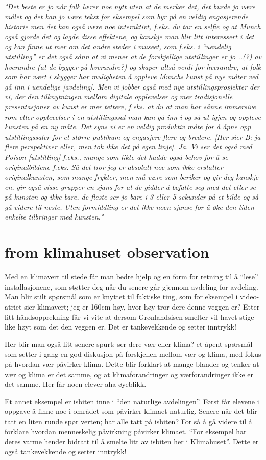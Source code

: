 \emph{"Det beste er jo når folk lærer noe nytt uten at de merker det, det burde jo være målet og det kan jo være tekst for eksempel som byr på en veldig engasjerende historie men det kan også være noe interaktivt, f.eks. du tar en selfie og at Munch også gjorde det og lagde disse effektene, og kanskje man blir litt interessert i det og kan finne ut mer om det andre steder i museet, som f.eks. i “uendelig utstilling” er det også sånn at vi mener at de forskjellige utstillinger er jo ..(?) av hverandre (at de bygger på hverandre?) og skaper altså verdi for hverandre, at folk som har vært i skygger har muligheten å oppleve Munchs kunst på nye måter ved gå inn i uendelige [avdeling]. Men vi jobber også med nye utstillingsprosjekter der vi, der den tilknytningen mellom digitale opplevelser og mer tradisjonelle presentasjoner av kunst er mer tettere, f.eks. at du at man har sånne immersive rom eller opplevelser i en utstillingssal man kan gå inn i og så ut igjen og oppleve kunsten på en ny måte. Det syns vi er en veldig produktiv måte for å åpne opp utstillingssaler for et større publikum og engasjere flere og bredere. [Her sier B: ja flere perspektiver eller, men tok ikke det på egen linje]. Ja. Vi ser det også med Poison [utstilling] f.eks., mange som likte det hadde også behov for å se originalbildene f.eks. Så det tror jeg er absolutt noe som ikke erstatter originalkunsten, som mange frykter, men må være som beriker og gir deg kanskje en, gir også visse grupper en sjans for at de gidder å befatte seg med det eller se på kunsten og ikke bare, de fleste ser jo bare i 3 eller 5 sekunder på et bilde og så gå videre til neste. Uten formiddling er det ikke noen sjanse for å øke den tiden enkelte tilbringer med kunsten."}


\section{from klimahuset observation}
Med en klimavert til stede får man bedre hjelp og en form for retning til å “lese” installasjonene, som støtter deg når du senere går gjennom avdeling for avdeling. 
Man blir stilt spørsmål som er knyttet til faktiske ting, som for eksempel i video-atriet sier klimavert; jeg er 160cm høy, hvor høy tror dere denne veggen er?
Etter litt håndsopprekning får vi vite at dersom Grønlandsisen smelter vil havet stige like høyt som det den veggen er. Det er tankevekkende og setter inntrykk!

Her blir man også litt senere spurt: ser dere vær eller klima? et åpent spørsmål som setter i gang en god diskusjon på forskjellen mellom vær og klima, med fokus på hvordan vær påvirker klima. Dette blir forklart at mange blander og tenker at vær og klima er det samme, og at klimaforandringer og værforandringer ikke er det samme. Her får noen elever aha-øyeblikk.


Et annet eksempel er isbiten inne i “den naturlige avdelingen”.  Først får elevene i oppgave å finne noe i området som påvirker klimaet naturlig. Senere når det blir tatt en liten runde spør verten; har alle tatt på isbiten? For så å gå videre til å forklare hvordan menneskelig påvirkning påvirker klimaet. “For eksempel har deres varme hender bidratt til å smelte litt av isbiten her i Klimahuset”. Dette er også tankevekkende og setter inntrykk!
